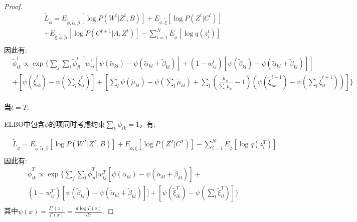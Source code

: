 \begin{proof}
	\begin{equation}
		\begin{split}
			& \widetilde{L}_{\widetilde{\phi}} = E_{\widetilde{\phi},\widetilde{\alpha},\widetilde{\beta}} [\log P(W^t|Z^t,B)]+E_{\widetilde{\phi},\widetilde{\xi}} [\log P(Z^t|C^t)]\\
			&+  E_{\widetilde{\xi},\widetilde{\phi},\widetilde{\mu}} [\log P(C^{t+1}|A,Z^t)]- \sum_{i=1}^N E_{\widetilde{\phi}}[\log q(z_i^t)]\\
		\end{split}
	\end{equation}
	因此有:
	\begin{equation}
		\label{appendix:eq9}
		\begin{split}
			&\widetilde{\phi}_{ik}^t \propto \exp \{ \sum_j \sum_l \widetilde{\phi}_{jl}^t [w_{ij}^t[\psi(\widetilde{\alpha}_{kl}) - \psi(\widetilde{\alpha}_{kl}+\widetilde{\beta}_{kl})]
			+ (1-w_{ij}^t)[\psi(\widetilde{\beta}_{kl})-\psi(\widetilde{\alpha}_{kl}+\widetilde{\beta}_{kl})]]    \\
			& + [\psi(\widetilde{\xi}_{ik}^t) - \psi(\sum_l \widetilde{\xi}_{il}^t)]+ [\sum_l \psi(\widetilde{\mu}_{kl}) - \psi(\sum_l \widetilde{\mu}_{kl}) 
			+\sum_l (\frac{\widetilde{\mu}_{kl}}{\sum_l \widetilde{\mu}_{kl}} -1)(\psi(\widetilde{\xi}_{ik}^{t+1}) - \psi(\sum_l \widetilde{\xi}_{il}^{t+1}))]  \}\\
		\end{split}
	\end{equation} 
	
	\textbf{当$t=T$}:
	
	ELBO中包含$\widetilde{\phi}$的项同时考虑约束$\sum_k \widetilde{\phi}_{ik} = 1 $，有:
	
	\begin{equation}
		\begin{split}
			& \widetilde{L}_{\widetilde{\phi}} = E_{\widetilde{\phi},\widetilde{\alpha},\widetilde{\beta}} [\log P(W^T|Z^T,B)]+E_{\widetilde{\phi},\widetilde{\xi}} [\log P(Z^T|C^T)]
			- \sum_{i=1}^N E_{\widetilde{\phi}}[\log q(z_i^T)]\\
		\end{split}
	\end{equation}
	因此有:
	\begin{equation}
		\label{appendix:eq10}
		\begin{split}
			&\widetilde{\phi}_{ik}^T \propto \exp \{ \sum_j \sum_l \widetilde{\phi}_{jl}^T [w_{ij}^T[\psi(\widetilde{\alpha}_{kl}) - \psi(\widetilde{\alpha}_{kl}+\widetilde{\beta}_{kl})] + \\
			&(1-w_{ij}^T)[\psi(\widetilde{\beta}_{kl})-\psi(\widetilde{\alpha}_{kl}+\widetilde{\beta}_{kl})]]  + [\psi(\widetilde{\xi}_{ik}^T) - \psi(\sum_l \widetilde{\xi}_{il}^T)]\}  \\
		\end{split}
	\end{equation} 
	其中$\psi(x) = \frac{\Gamma'(x)}{\Gamma(x)} = \frac{\,d \log \Gamma(x)}{\, dx}$.
	
\end{proof}
